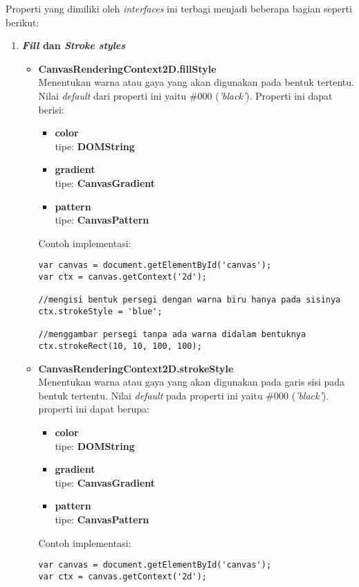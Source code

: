 Properti yang dimiliki oleh \textit{interfaces} ini terbagi menjadi beberapa bagian seperti berikut:
\begin{enumerate}
	\item \textbf{\textit{Fill} dan \textit{Stroke styles}}
	\begin{itemize}
		\item \textbf{CanvasRenderingContext2D.fillStyle} \\ Menentukan warna atau gaya yang akan digunakan pada bentuk tertentu. Nilai \textit{default} dari properti ini yaitu \#000 (\textit{'black'}). Properti ini dapat berisi:
		\begin{itemize}
			\item \textbf{color} \\tipe: \textbf{DOMString} 
			\item \textbf{gradient} \\tipe: \textbf{CanvasGradient}
			\item \textbf{pattern} \\tipe: \textbf{CanvasPattern}
		\end{itemize}
		Contoh implementasi:
\begin{lstlisting}
var canvas = document.getElementById('canvas');
var ctx = canvas.getContext('2d');
	
//mengisi bentuk persegi dengan warna biru hanya pada sisinya
ctx.strokeStyle = 'blue'; 

//menggambar persegi tanpa ada warna didalam bentuknya
ctx.strokeRect(10, 10, 100, 100);
\end{lstlisting}
		
		\item \textbf{CanvasRenderingContext2D.strokeStyle} \\ Menentukan warna atau gaya yang akan digunakan pada garis sisi pada bentuk tertentu. Nilai \textit{default} pada properti ini yaitu \#000 (\textit{'black'}). properti ini dapat berupa:
		\begin{itemize}
			\item \textbf{color} \\tipe: \textbf{DOMString} 
			\item \textbf{gradient} \\tipe: \textbf{CanvasGradient}
			\item \textbf{pattern} \\tipe: \textbf{CanvasPattern}
		\end{itemize}
		 Contoh implementasi:
\begin{lstlisting}
var canvas = document.getElementById('canvas');
var ctx = canvas.getContext('2d');


\end{lstlisting}
\end{itemize}
\end{enumerate}
